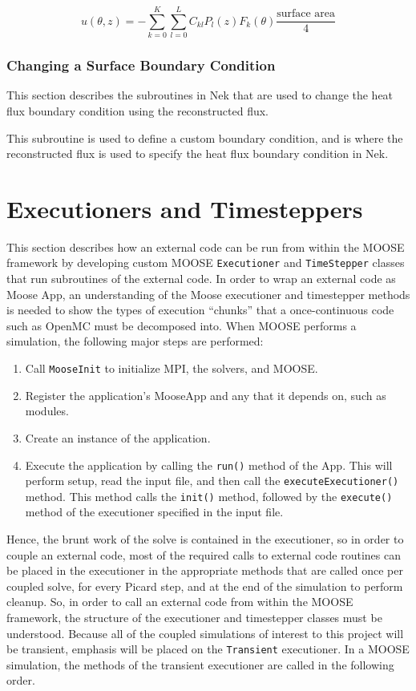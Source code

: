 \documentclass[10pt]{article}
\newcommand{\beq}{\begin{equation}}
\newcommand{\eeq}{\end{equation}}
\newcounter{subsubsubsection}[subsubsection]
\numberwithin{equation}{section} %
\begin{document}
\beq
u(\theta, z)=-\sum_{k=0}^{K}\sum_{l=0}^{L}C_{kl}P_l(z)F_k(\theta)\frac{\textrm{surface area}}{4}
\eeq


\subsubsection{Changing a Surface Boundary Condition}
This section describes the subroutines in Nek that are used to change the heat flux boundary condition using the reconstructed flux.

This subroutine is used to define a custom boundary condition, and is where the reconstructed flux is used to specify the heat flux boundary condition in Nek.
 

\clearpage
\section{Executioners and Timesteppers}
This section describes how an external code can be run from within the MOOSE framework by developing custom MOOSE {\tt Executioner} and {\tt TimeStepper} classes that run subroutines of the external code. In order to wrap an external code as Moose App, an understanding of the Moose executioner and timestepper methods is needed to show the types of execution ``chunks'' that a once-continuous code such as OpenMC must be decomposed into. When MOOSE performs a simulation, the following major steps are performed:

\begin{enumerate}
\item Call {\tt MooseInit} to initialize MPI, the solvers, and MOOSE.
\item Register the application's MooseApp and any that it depends on, such as modules. 
\item Create an instance of the application.
\item Execute the application by calling the {\tt run()} method of the App. This will perform setup, read the input file, and then call the {\tt executeExecutioner()} method. This method calls the {\tt init()} method, followed by the {\tt execute()} method of the executioner specified in the input file.
\end{enumerate}

Hence, the brunt work of the solve is contained in the executioner, so in order to couple an external code, most of the required calls to external code routines can be placed in the executioner in the appropriate methods that are called once per coupled solve, for every Picard step, and at the end of the simulation to perform cleanup. So, in order to call an external code from within the MOOSE framework, the structure of the executioner and timestepper classes must be understood. Because all of the coupled simulations of interest to this project will be transient, emphasis will be placed on the {\tt Transient} executioner. In a MOOSE simulation, the methods of the transient executioner are called in the following order. 
\end{document}
